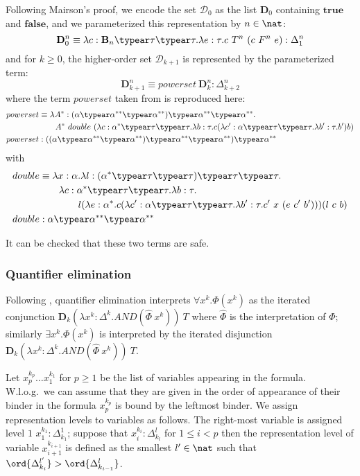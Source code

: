Following Mairson's  proof, we encode the set $\mathcal{D}_0$ as the list $\mathbf{D}_0$ containing $\mathbf{true}$ and $\mathbf{false}$, and we parameterized this representation by $n\in \nat$:
$$\mathbf{D}_0^n \equiv \lambda c:\booltype_n \typear \tau \typear \tau . \lambda e : \tau . c~T^n~(c~F^n~e) : \Delta_1^n$$
and for $k\geq 0$, the higher-order set $\mathcal{D}_{k+1}$ is represented by the parameterized term:
$$\mathbf{D}_{k+1}^n \equiv powerset~\mathbf{D}_k^n : \Delta_{k+2}^n$$
where the term $powerset$ taken from \cite{mairson1992spt} is reproduced here:
\begin{align*}
  powerset &\equiv \lambda A^* :(\alpha \typear \alpha^{**} \typear \alpha^{**}) \typear \alpha^{**} \typear \alpha^{**}.\\
&\qquad  A^*~double~(\lambda c:\alpha^* \typear \tau\typear \tau.\lambda b:\tau . c ( \lambda c':\alpha\typear \tau\typear \tau. \lambda b':\tau.b') b)\\
powerset &: ((\alpha \typear \alpha^{**} \typear \alpha^{**}) \typear \alpha^{**} \typear \alpha^{**})\typear \alpha^{**}
\end{align*}
with
\begin{align*}
  double &\equiv \lambda x :\alpha.\lambda l : (\alpha^* \typear \tau\typear \tau)\typear \tau\typear \tau. \\
  & \qquad \lambda c:\alpha^*\typear \tau\typear \tau.\lambda b:\tau. \\
  & \qquad \qquad l(\lambda e:\alpha^*.c (\lambda c':\alpha\typear \tau\typear \tau.\lambda b':\tau.c'~x~(e~c'~b')))(l~c~b)\\
double &: \alpha \typear \alpha^{**} \typear \alpha^{**}
\end{align*}

It can be checked that these two terms are safe.

\subsubsection{Quantifier elimination}
Following \cite{mairson1992spt}, quantifier elimination interprets $\forall x^k.\Phi(x^k)$ as the iterated conjunction $\mathbf{D}_k(\lambda x^k:\Delta^k.AND(\hat\Phi~x^k))~T$ where $\hat\Phi$ is the interpretation of $\Phi$; similarly $\exists x^k.\Phi(x^k)$  is interpreted by the iterated disjunction $\mathbf{D}_k(\lambda x^k:\Delta^k.AND(\hat\Phi~x^k))~T$.

Let $x^{k_p}_p \ldots x^{k_1}_1$ for $p\geq1$ be the list of variables appearing in the formula. W.l.o.g.\ we can assume that they are given in the order of appearance of their binder in the formula \ie $x^{k_p}_p$ is bound by the leftmost binder. We assign representation levels to variables as follows. The right-most variable is assigned level $1$ \ie $x^{k_1}_1 : \Delta^1_{k_1}$; suppose that $x^{k_i}_i :\Delta^l_{k_l}$ for $1\leq i< p$ then the representation level of variable $x^{k_{i+1}}_{i+1}$ is defined as
the smallest $l'\in\nat$ such that $\ord{\Delta^{l'}_{k_i}} > \ord{\Delta^{l}_{k_{i-1}}}$.

